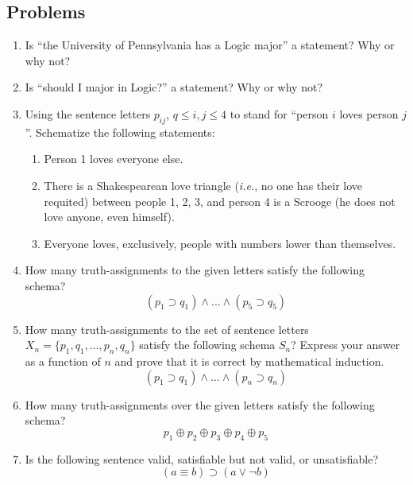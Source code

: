 \newpage
\begin{mdframed}[linewidth=1]
\section*{Problems}
\begin{enumerate}
    \item Is ``the University of Pennsylvania has a Logic major'' a statement? Why or why not? 

    \item Is ``should I major in Logic?'' a statement? Why or why not?

    \item Using the sentence letters $p_{ij}$, $q \leq i, j \leq 4$ to stand for ``person $i$ loves person $j$''. Schematize the following statements:
    \begin{enumerate}
        \item Person 1 loves everyone else.

        \item There is a Shakespearean love triangle (\emph{i.e.}, no one has their love requited) between people 1, 2, 3, and person 4 is a Scrooge (he does not love anyone, even himself). 

        \item Everyone loves, exclusively, people with numbers lower than themselves. 
    \end{enumerate}

    \item How many truth-assignments to the given letters satisfy the following schema?
    \[
        (p_1 \supset q_1) \land ... \land (p_5 \supset q_5)
    \]

    \item How many truth-assignments to the set of sentence letters $X_n=
    \{p_1,q_1,\ldots,p_n,q_n\}$ satisfy the following schema $S_n$? Express your answer as a function of $n$ and prove that it is correct by mathematical induction. 
    \[
      (p_1 \supset q_1) \land ... \land (p_n \supset q_n)  
    \]

    \item How many truth-assignments over the given letters satisfy the following schema?
    \[
        p_1 \oplus p_2 \oplus p_3 \oplus p_4 \oplus p_5
    \]

     \item Is the following sentence valid, satisfiable but not valid, or unsatisfiable?
    \[
        (a \equiv b) \supset (a \vee \lnot b)
    \]


\end{enumerate}
\end{mdframed}
